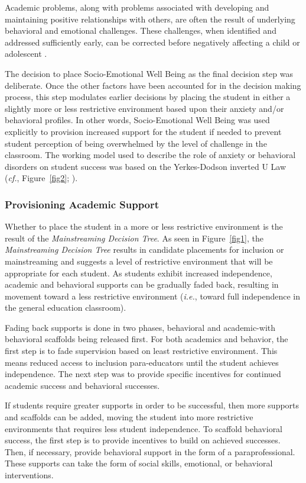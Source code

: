 \documentclass[twoside]{article}
\begin{document}
Academic problems, along with problems associated with developing and maintaining positive relationships with others, are often the result of underlying behavioral and emotional challenges. These challenges, when identified and addressed sufficiently early, can be corrected before negatively affecting a child or adolescent \parencite{raines2012universal,reid2004meta}.

The decision to place Socio-Emotional Well Being as the final decision step was deliberate. Once the other factors have been accounted for in the decision making process, this step modulates earlier decisions by placing the student in either a slightly more or less restrictive environment based upon their anxiety and/or behavioral profiles. In other words, Socio-Emotional Well Being was used explicitly to provision increased support for the student if needed to prevent student perception of being overwhelmed by the level of challenge in the classroom. The working model used to describe the role of anxiety or behavioral disorders on student success was based on the Yerkes-Dodson inverted U Law (\textit{cf.}, Figure~\ref{fig2}; \cite{yerkes1908relation,cohen2011yerkes,cooray2005anxiety}).

\subsubsection{Provisioning Academic Support}
Whether to place the student in a more or less restrictive environment is the result of the \textit{Mainstreaming Decision Tree}. As seen in Figure~\ref{fig1}, the \textit{Mainstreaming Decision Tree} results in candidate placements for inclusion or mainstreaming and suggests a level of restrictive environment that will be appropriate for each student. As students exhibit increased independence, academic and behavioral supports can be gradually faded back, resulting in movement toward a less restrictive environment (\textit{i.e.}, toward full independence in the general education classroom). 

Fading back supports is done in two phases, behavioral and academic-with behavioral scaffolds being released first. For both academics and behavior, the first step is to fade supervision based on least restrictive environment. This means reduced access to inclusion para-educators until the student achieves independence. The next step was to provide specific incentives for continued academic success and behavioral successes. 

If students require greater supports in order to be successful, then more supports and scaffolds can be added, moving the student into more restrictive environments that requires less student independence. To scaffold behavioral success, the first step is to provide incentives to build on achieved successes. Then, if necessary, provide behavioral support in the form of a paraprofessional. These supports can take the form of social skills, emotional, or behavioral interventions. 
\end{document}
